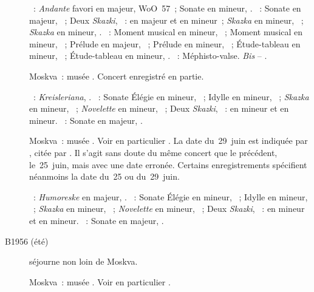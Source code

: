 \begin{description}
 \textsc{\Beethoven{}}~: \emph{Andante} favori en \kF majeur, WoO~57~;
 Sonate en \kC mineur, .
 \textsc{\Medtner{}}~: Sonate en \kC majeur,  ~; Deux
 \emph{Skazki}, ~:  en \kE \Flat majeur et  en
 \kF mineur~; \emph{Skazka} en \kE mineur,  ~;
 \emph{Skazka} en \kB mineur,  .
 \textsc{\Rachmaninov{}}~: Moment musical en \kE \Flat mineur, 
 ~; Moment musical en \kB mineur,  ~; Prélude
 en \kG majeur,  ~; Prélude en \kG \Sharp mineur,
  ~; Étude-tableau en \kB mineur,  ~;
 Étude-tableau en \kA mineur,  .
 \textsc{\Liszt{}}~: Méphisto-valse.
 \emph{Bis} -- \textsc{\Scriabine{}}.
 \item[\DateWithWeekDay{1956-06-25}]
 Moskva~: musée \Scriabine{}.
 Concert enregistré en partie.

 \textsc{\Schumann{}}~: \emph{Kreisleriana}, .
 \textsc{\Medtner{}}~: Sonate Élégie en \kD mineur,  ~;
 Idylle en \kB mineur,  ~; \emph{Skazka} en \kE mineur,
  ~; \emph{Novelette} en \kC mineur, 
 ~; Deux \emph{Skazki}, ~:  en \kB \Flat
 mineur et  en \kB mineur.
 \textsc{\Scriabine{}}~: Sonate en \kF \Sharp majeur, .
 \item[\DateWithWeekDay{1956-06-29}]
 Moskva~: musée \Scriabine{}.
 Voir en particulier \citet[p.~449]{Milshteyn82a}.
 La date du~29~juin est indiquée par \citeauthor{Shiryaeva}, citée par
 \citet[p.~439]{Scriabine}.
 Il s'agit sans doute du même concert que le précédent, le~25~juin, mais
 avec une date erronée.
 Certains enregistrements spécifient néanmoins la date du~25 ou du~29~juin.

 \textsc{\Schumann{}}~: \emph{Humoreske} en \kB \Flat majeur, .
 \textsc{\Medtner{}}~: Sonate Élégie en \kD mineur,  ~;
 Idylle en \kB mineur,  ~; \emph{Skazka} en \kE mineur,
  ~; \emph{Novelette} en \kC mineur, 
 ~; Deux \emph{Skazki}, ~:  en \kB \Flat
 mineur et  en \kB mineur.
 \textsc{\Scriabine{}}~: Sonate en \kF \Sharp majeur, .
 \item[B1956 (été)]
 \VSofronitsky{} séjourne non loin de Moskva.
 \item[\DateWithWeekDay{1956-09-25}]
 Moskva~: musée \Scriabine{}.
 Voir en particulier \citet[p.~449]{Milshteyn82a}.


\end{description}
